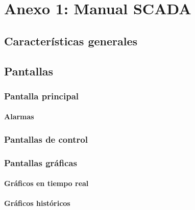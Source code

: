\section{Anexo 1: Manual SCADA}
\subsection{Características generales}
\subsection{Pantallas}
\subsubsection{Pantalla principal}
\paragraph{Alarmas}
\subsubsection{Pantallas de control}
\subsubsection{Pantallas gráficas}
\paragraph{Gráficos en tiempo real}
\paragraph{Gráficos históricos}



\newpage